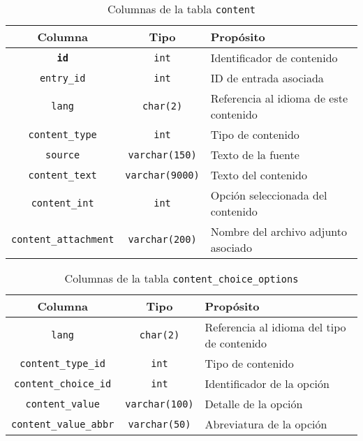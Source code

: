 \documentclass[11pt]{article} %
\begin{document}
\begin{table}
\centering
\begin{tabular}{ccp{6cm}} 
\toprule 
Columna & Tipo &Propósito \\ \midrule 
\texttt{\bf id} &\texttt{int} & Identificador de contenido \\ 
\texttt{entry\_id} &\texttt{int} &  ID de entrada asociada \\ 
\texttt{lang} & \texttt{char(2)} & Referencia al idioma de este contenido\\ 
\texttt{content\_type} & \texttt{int} & Tipo de contenido\\ 
\texttt{source} & \texttt{varchar(150)} & Texto de la fuente  \\ 
\texttt{content\_text} & \texttt{varchar(9000)} & Texto del contenido \\ 
\texttt{content\_int} & \texttt{int} & Opción seleccionada del contenido\\ 
\texttt{content\_attachment} & \texttt{varchar(200)} & Nombre del archivo adjunto asociado\\ 
\bottomrule 
\end{tabular}
\caption{Columnas de la tabla \texttt{content}}
\end{table}

\begin{table}
\centering
\begin{tabular}{ccp{6cm}} 
\toprule 
Columna & Tipo &Propósito \\ \midrule 
\texttt{lang} & \texttt{char(2)} & Referencia al idioma del tipo de contenido\\ 
\texttt{content\_type\_id} & \texttt{int} & Tipo de contenido \\ \texttt{content\_choice\_id} & \texttt{int} & Identificador de la opción \\
\texttt{content\_value} & \texttt{varchar(100)} & Detalle de la opción \\ 
\texttt{content\_value\_abbr} & \texttt{varchar(50)} & Abreviatura de la opción \\ 
\bottomrule 
\end{tabular}
\caption{Columnas de la tabla \texttt{content\_choice\_options}}
\end{table}
\end{document}
